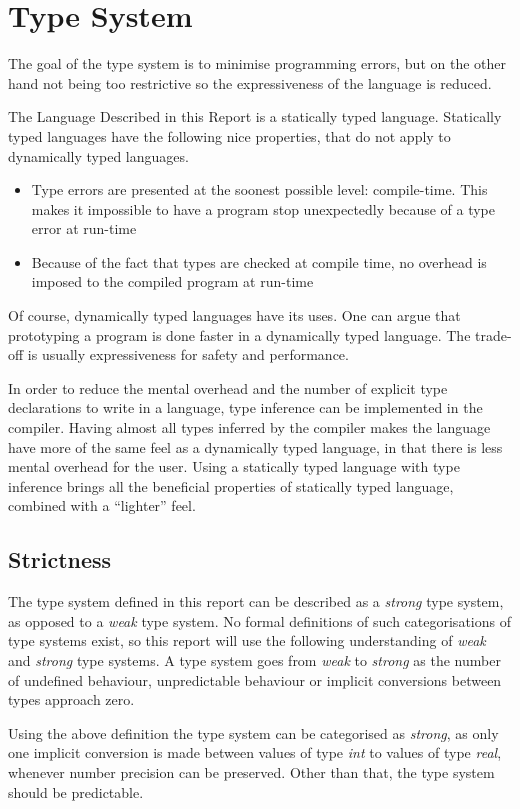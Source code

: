 \section{Type System}

The goal of the type system is to minimise programming errors, but on the other hand not being too restrictive so the expressiveness of the language is reduced. 

The Language Described in this Report is a statically typed language. Statically typed languages have the following nice properties, that do not apply to dynamically typed languages.

\begin{itemize}
  \item Type errors are presented at the soonest possible level: compile-time. This makes it impossible to have a program stop unexpectedly because of a type error at run-time
  \item Because of the fact that types are checked at compile time, no overhead is imposed to the compiled program at run-time
\end{itemize}

Of course, dynamically typed languages have its uses. One can argue that prototyping a program is done faster in a dynamically typed language. The trade-off is usually expressiveness for safety and performance.

In order to reduce the mental overhead and the number of explicit type declarations to write in a language, type inference can be implemented in the compiler. Having almost all types inferred by the compiler makes the language have more of the same feel as a dynamically typed language, in that there is less mental overhead for the user. Using a statically typed language with type inference brings all the beneficial properties of statically typed language, combined with a \enquote{lighter} feel.

\subsection{Strictness}

The type system defined in this report can be described as a \emph{strong} type system, as opposed to a \emph{weak} type system. No formal definitions of such categorisations of type systems exist, so this report will use the following understanding of \emph{weak} and \emph{strong} type systems. A type system goes from \emph{weak} to \emph{strong} as the number of undefined behaviour, unpredictable behaviour or implicit conversions between types approach zero.

Using the above definition the type system can be categorised as \emph{strong}, as only one implicit conversion is made between values of type \emph{int} to values of type \emph{real}, whenever number precision can be preserved. Other than that, the type system should be predictable.


